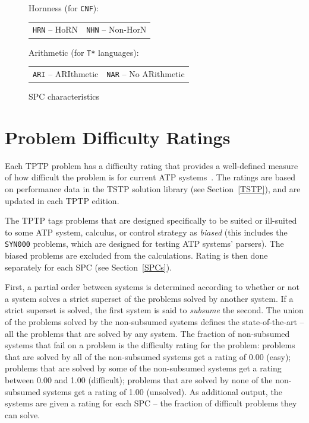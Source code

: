 \documentclass[runningheads]{llncs}
\newenvironment{packed_itemize}{
\vspace*{-0.2em}
\begin{itemize}
\setlength{\partopsep}{0pt}
\setlength{\itemsep}{1pt}
\setlength{\parskip}{0pt}
\setlength{\parsep}{0pt}
}{\end{itemize}}
\begin{document}
\begin{figure}[bht]
\begin{packed_itemize}
\item Hornness (for {\tt CNF}): \\
      \begin{tabular}{@{}p{5cm}l}
      {\tt HRN} -- HoRN &
      {\tt NHN} -- Non-HorN
      \end{tabular}
\item Arithmetic (for {\tt T*} languages): \\
      \begin{tabular}{@{}p{5cm}l}
      {\tt ARI} -- ARIthmetic &
      {\tt NAR} -- No ARithmetic
      \end{tabular}
\end{packed_itemize}
\caption{SPC characteristics}
\label{SPCCharacteristics}
\end{figure} 

\section{Problem Difficulty Ratings}
\label{Ratings}

Each TPTP problem has a difficulty rating that provides a well-defined measure of how difficult 
the problem is for current ATP systems~\cite{SS01}.
The ratings are based on performance data in the TSTP solution library (see Section~\ref{TSTP}), 
and are updated in each TPTP edition.

The TPTP tags problems that are designed specifically to be suited or ill-suited to some ATP
system, calculus, or control strategy as {\em biased}
(this includes the {\tt SYN000} problems, which are designed for testing ATP systems' parsers).
The biased problems are excluded from the calculations.
Rating is then done separately for each SPC (see Section~\ref{SPCs}).

First, a partial order between systems is determined according to whether or not a system 
solves a strict superset of the problems solved by another system. 
If a strict superset is solved, the first system is said to {\em subsume} the second. 
The union of the problems solved by the non-subsumed systems defines the state-of-the-art -- all 
the problems that are solved by any system. 
The fraction of non-subsumed systems that fail on a problem is the difficulty rating 
for the problem:
problems that are solved by all of the non-subsumed systems get a rating of 0.00 (easy);
problems that are solved by some of the non-subsumed systems get a rating between 0.00 and 1.00 
(difficult); 
problems that are solved by none of the non-subsumed systems get a rating of 1.00 (unsolved).
As additional output, the systems are given a rating for each SPC -- the fraction of difficult 
problems they can solve.
\end{document}
